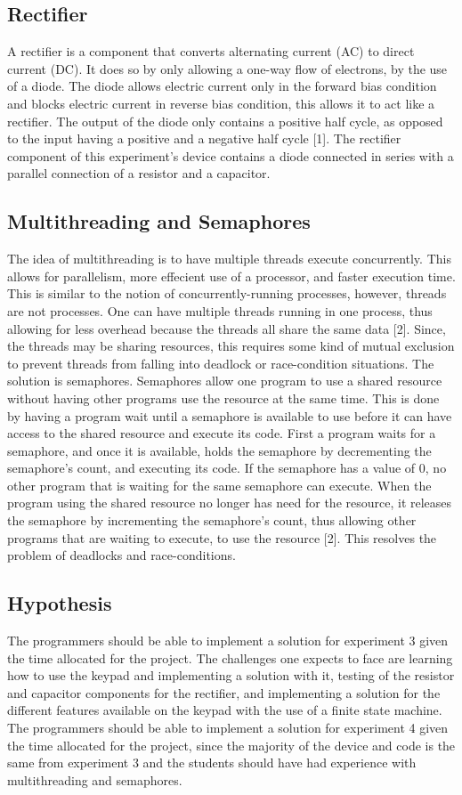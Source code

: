 \documentclass[12pt]{report}
\begin{document}
\subsection{Rectifier}
A rectifier is a component that converts alternating current (AC) to direct current (DC). It does so by only allowing a one-way flow of electrons, by the use of a diode. The diode allows electric current only in the forward bias condition and blocks electric current in reverse bias condition, this allows it to act like a rectifier. The output of the diode only contains a positive half cycle, as opposed to the input having a positive and a negative half cycle [1]. The rectifier component of this experiment's device contains a diode connected in series with a parallel connection of a resistor and a capacitor.

\subsection{Multithreading and Semaphores}
The idea of multithreading is to have multiple threads execute concurrently. This allows for parallelism, more effecient use of a processor, and faster execution time. This is similar to the notion of concurrently-running processes, however, threads are not processes. One can have multiple threads running in one process, thus allowing for less overhead because the threads all share the same data [2]. Since, the threads may be sharing resources, this requires some kind of mutual exclusion to prevent threads from falling into deadlock or race-condition situations. The solution is semaphores. Semaphores allow one program to use a shared resource without having other programs use the resource at the same time. This is done by having a program wait until a semaphore is available to use before it can have access to the shared resource and execute its code. First a program waits for a semaphore, and once it is available, holds the semaphore by decrementing the semaphore's count, and executing its code. If the semaphore has a value of 0, no other program that is waiting for the same semaphore can execute. When the program using the shared resource no longer has need for the resource, it releases the semaphore by incrementing the semaphore's count, thus allowing other programs that are waiting to execute, to use the resource [2]. This resolves the problem of deadlocks and race-conditions.

\subsection{Hypothesis}
The programmers should be able to implement a solution for experiment 3 given the time allocated for the project. The challenges one expects to face are learning how to use the keypad and implementing a solution with it, testing of the resistor and capacitor components for the rectifier, and implementing a solution for the different features available on the keypad with the use of a finite state machine. The programmers should be able to implement a solution for experiment 4 given the time allocated for the project, since the majority of the device and code is the same from experiment 3 and the students should have had experience with multithreading and semaphores.
\end{document}
